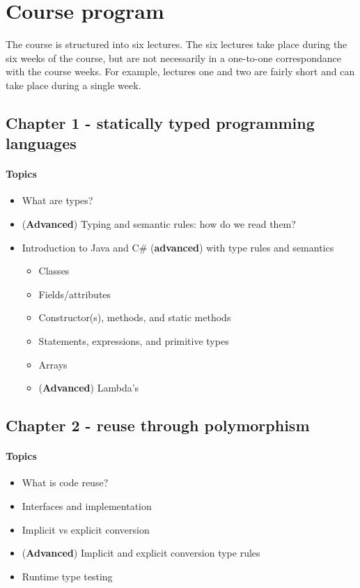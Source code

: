 \section{Course program}
The course is structured into six lectures. The six lectures take place during the six weeks of the course, but are not necessarily in a one-to-one correspondance with the course weeks. For example, lectures one and two are fairly short and can take place during a single week.

\subsection{Chapter 1 - statically typed programming languages}
\paragraph*{Topics}
\begin{itemize}
	\item What are types?
	\item (\textbf{Advanced}) Typing and semantic rules: how do we read them?
	\item Introduction to Java and C\# (\textbf{advanced}) with type rules and semantics
	\begin{itemize}
		\item Classes
		\item Fields/attributes
		\item Constructor(s), methods, and static methods
		\item Statements, expressions, and primitive types
		\item Arrays
		\item (\textbf{Advanced}) Lambda's
	\end{itemize}
\end{itemize}

\subsection{Chapter 2 - reuse through polymorphism}
\paragraph*{Topics}			
\begin{itemize}
	\item What is code reuse?
	\item Interfaces and implementation
	\item Implicit vs explicit conversion
	\item (\textbf{Advanced}) Implicit and explicit conversion type rules
	\item Runtime type testing
\end{itemize}

